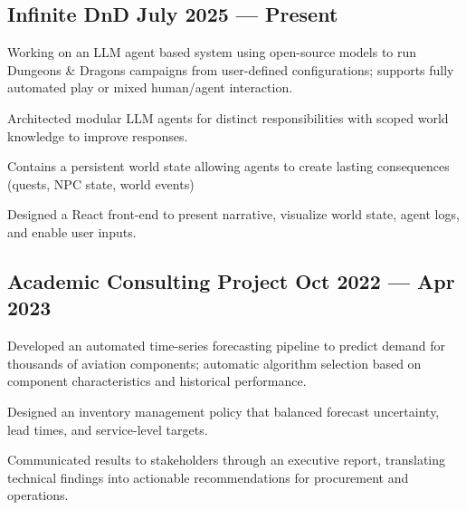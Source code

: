 \subsection{{Infinite DnD \hfill July 2025 --- Present}}
\begin{zitemize}
    \setlength\itemsep{0.4em}
    \item Working on an LLM agent based system using open-source models to run Dungeons \& Dragons campaigns from user-defined configurations; supports fully automated play or mixed human/agent interaction.
    \item Architected modular LLM agents for distinct responsibilities with scoped world knowledge to improve responses.
    \item Contains a persistent world state allowing agents to create lasting consequences (quests, NPC state, world events)
    \item Designed a React front-end to present narrative, visualize world state, agent logs, and enable user inputs.
\end{zitemize}
\vspace{0.75em}

\subsection{{Academic Consulting Project \hfill Oct 2022 --- Apr 2023}}
\begin{zitemize}
    \setlength\itemsep{0.4em}
    \item Developed an automated time-series forecasting pipeline to predict demand for thousands of aviation components; automatic algorithm selection based on component characteristics and historical performance.
    \item Designed an inventory management policy that balanced forecast uncertainty, lead times, and service-level targets.
    \item Communicated results to stakeholders through an executive report, translating technical findings into actionable recommendations for procurement and operations.
\end{zitemize}
\vspace{0.75em}


